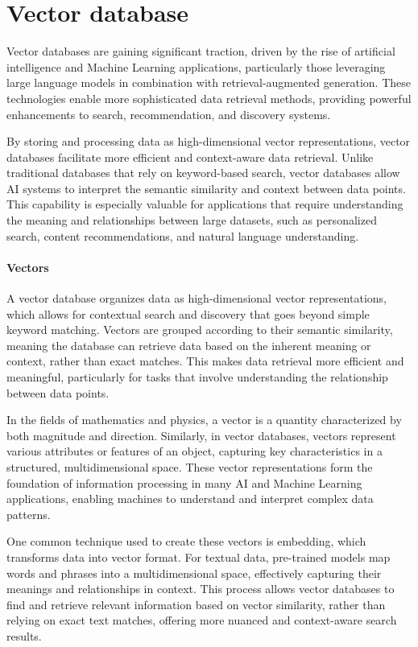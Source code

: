 \section{Vector database}

Vector databases are gaining significant traction, driven by the rise of artificial intelligence and Machine Learning applications, particularly those leveraging large language models in combination with retrieval-augmented generation. 
These technologies enable more sophisticated data retrieval methods, providing powerful enhancements to search, recommendation, and discovery systems. 

By storing and processing data as high-dimensional vector representations, vector databases facilitate more efficient and context-aware data retrieval. 
Unlike traditional databases that rely on keyword-based search, vector databases allow AI systems to interpret the semantic similarity and context between data points. 
This capability is especially valuable for applications that require understanding the meaning and relationships between large datasets, such as personalized search, content recommendations, and natural language understanding.

\paragraph*{Vectors}
A vector database organizes data as high-dimensional vector representations, which allows for contextual search and discovery that goes beyond simple keyword matching. 
Vectors are grouped according to their semantic similarity, meaning the database can retrieve data based on the inherent meaning or context, rather than exact matches. 
This makes data retrieval more efficient and meaningful, particularly for tasks that involve understanding the relationship between data points.

In the fields of mathematics and physics, a vector is a quantity characterized by both magnitude and direction. 
Similarly, in vector databases, vectors represent various attributes or features of an object, capturing key characteristics in a structured, multidimensional space. 
These vector representations form the foundation of information processing in many AI and Machine Learning applications, enabling machines to understand and interpret complex data patterns.

One common technique used to create these vectors is embedding, which transforms data into vector format. 
For textual data, pre-trained models map words and phrases into a multidimensional space, effectively capturing their meanings and relationships in context. 
This process allows vector databases to find and retrieve relevant information based on vector similarity, rather than relying on exact text matches, offering more nuanced and context-aware search results.

